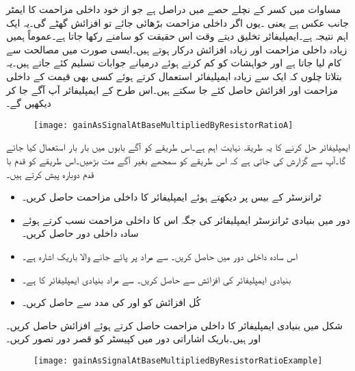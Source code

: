 مساوات  میں کسر کے نچلے  حصے میں   دراصل   ہے جو از خود  داخلی مزاحمت کا ایمٹر جانب عکس ہے یعنی ۔یوں اگر داخلی مزاحمت بڑھائی جائے تو افزائش  گھٹے گی۔یہ ایک اہم نتیجہ ہے۔ایمپلیفائر تخلیق دیتے وقت اس حقیقت کو سامنے رکھا جاتا ہے۔عموماً ہمیں زیادہ داخلی مزاحمت اور زیادہ افزائش درکار ہوتے ہیں۔ایسی صورت میں مصالحت سے کام لیا جاتا ہے اور خواہشات کو کم کرتے ہوئے درمیانے جوابات تسلیم کئے جاتے ہیں۔یہ بتلاتا چلوں کہ ایک سے زیادہ ایمپلیفائر استعمال کرتے ہوئے کسی بھی قیمت کے داخلی مزاحمت اور افزائش حاصل کئے جا سکتے ہیں۔اس طرح کے ایمپلیفائر آپ آگے جا کر دیکھیں گے۔
\begin{figure}
\centering
\texttt{[image: gainAsSignalAtBaseMultipliedByResistorRatioA]}
\caption{}
\label{شکل_ٹرانزسٹر_افزائش_کو_داخلی_مزاحمت_کی_مدد_سے_الف}
\end{figure}

ایمپلیفائر حل کرنے کا یہ طریقہ نہایت اہم ہے۔اس طریقے کو آگے بابوں میں بار بار استعمال کیا جائے گا۔آپ سے گزارش کی جاتی ہے کہ اس طریقے کو سمجھے بغیر آگے مت بڑھیں۔اس طریقے کو قدم با قدم دوبارہ پیش کرتے ہیں۔
\begin{itemize}
\item
ٹرانزسٹر کے بیس پر دیکھتے ہوئے ایمپلیفائر کا داخلی مزاحمت  حاصل کریں۔
\item
دور میں بنیادی ٹرانزسٹر ایمپلیفائر کی جگہ اس کا داخلی مزاحمت  نسب کرتے ہوئے سادہ داخلی دور حاصل کریں۔
\item
اس سادہ داخلی دور میں  حاصل کریں۔  سے مراد  پر پائے جانے والا باریک اشارہ ہے۔
\item
بنیادی ایمپلیفائر کی افزائش  سے حاصل کریں۔ سے مراد بنیادی ایمپلیفائر کا
  ہے۔
\item
کُل افزائش  کو  اور  کی مدد سے حاصل کریں۔
\end{itemize}
شکل  میں بنیادی ایمپلیفائر کا داخلی مزاحمت حاصل کرتے ہوئے افزائش  حاصل کریں۔ اور  ہیں۔باریک اشاراتی دور میں کپیسٹر کو قصر دور تصور کریں۔
\begin{figure}
\centering
\texttt{[image: gainAsSignalAtBaseMultipliedByResistorRatioExample]}
\caption{}
\label{شکل_ٹرانزسٹر_داخلی_مزاحمت_سے_افزائش}
\end{figure}


